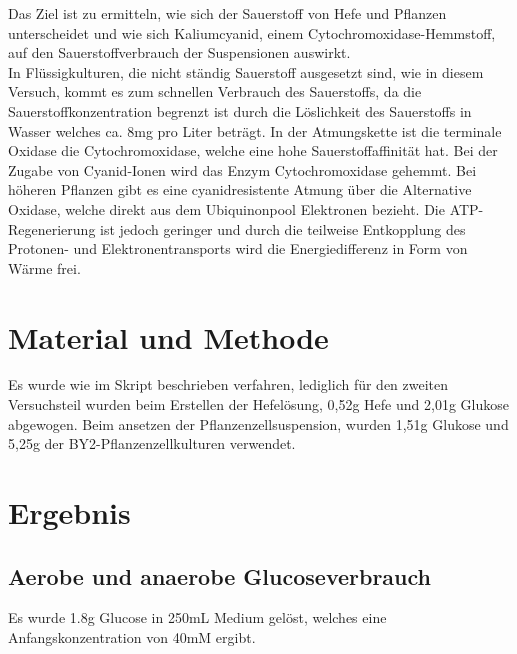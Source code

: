 \documentclass[10pt,a4paper]{article}
\begin{document}
		Das Ziel ist zu ermitteln, wie sich der Sauerstoff von Hefe und Pflanzen unterscheidet und wie sich Kaliumcyanid, einem Cytochromoxidase-Hemmstoff, auf den Sauerstoffverbrauch der Suspensionen auswirkt.\\
		 In Flüssigkulturen, die nicht ständig Sauerstoff ausgesetzt sind, wie in diesem Versuch, kommt es zum schnellen Verbrauch des Sauerstoffs, da die Sauerstoffkonzentration begrenzt ist durch die Löslichkeit des Sauerstoffs in Wasser welches ca. 8mg pro Liter beträgt. In der Atmungskette ist die terminale Oxidase die Cytochromoxidase, welche eine hohe Sauerstoffaffinität hat. Bei der Zugabe von Cyanid-Ionen wird das Enzym Cytochromoxidase gehemmt. Bei höheren Pflanzen gibt es eine cyanidresistente Atmung über die Alternative Oxidase, welche direkt aus dem Ubiquinonpool Elektronen bezieht. Die ATP-Regenerierung ist jedoch geringer und durch die teilweise Entkopplung des Protonen- und Elektronentransports wird die Energiedifferenz in Form von Wärme frei.\\
		 

	
	\section{Material und Methode}
	Es wurde wie im Skript beschrieben verfahren, lediglich für den zweiten Versuchsteil wurden beim Erstellen der Hefelösung, 0,52g Hefe und 2,01g Glukose abgewogen. Beim ansetzen der Pflanzenzellsuspension, wurden 1,51g Glukose und 5,25g der BY2-Pflanzenzellkulturen verwendet.
	
	\section{Ergebnis}
	\subsection{Aerobe und anaerobe Glucoseverbrauch}
	Es wurde 1.8g Glucose in 250mL Medium gelöst, welches eine Anfangskonzentration von 40mM ergibt.\\
	
\end{document}
